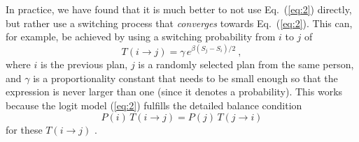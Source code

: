 In practice, we have found that it is much better to not use
Eq.~(\ref{eq:2}) directly, but rather use a switching process that
\emph{converges} towards Eq.~(\ref{eq:2}).  This can, for example, be
achieved by using a switching probability from $i$ to $j$ of
\begin{equation}
T(i \to j) = \gamma \,  e^{\beta ( S_j - S_i )/2} \ ,
\label{eq:3}
\end{equation}
where $i$ is the previous plan, $j$ is a randomly selected plan from
the same person, and $\gamma$ is a proportionality constant that needs
to be small enough so that the expression is never larger than one
(since it denotes a probability).  This works because the logit model
(\ref{eq:2})
fulfills the detailed balance condition
\begin{equation}
P(i) \, T(i \to j) = P(j) \, T(j \to i) 
\label{eq:detailed-balance}
\end{equation}
for these $T(i \to j)$ \citep[e.g.,][]{ross-2006}.%
